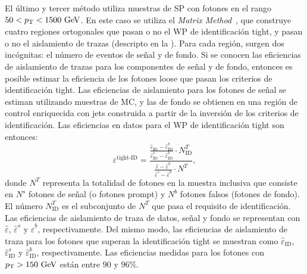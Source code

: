 El último y tercer método utiliza muestras de \ac{SP} con fotones en el rango \(50<p_{\text{T}}<1500~\text{GeV}\). En este caso se utiliza el \textit{Matrix Method}~\cite{ATLAS-EGamma-Performance-2015-2016}, que construye cuatro regiones ortogonales que pasan o no el \ac{WP} de identificación tight, y pasan o no el aislamiento de trazas (descripto en la \Sect{\ref{subsec:objects:egamma:iso}}). Para cada región, surgen dos incógnitas: el número de eventos de señal y de fondo.
Si se conocen las eficiencias de aislamiento de trazas para los componentes de señal y de fondo, entonces es posible estimar la eficiencia de los fotones loose que pasan los criterios de identificación tight. Las eficiencias de aislamiento para los fotones de señal se estiman utilizando muestras de \ac{MC}, y las de fondo se obtienen en una región de control enriquecida con jets construida a partir de la inversi\'on de los criterios de identificación.
Las eficiencias en datos para el \ac{WP} de identificación tight son entonces:
\begin{equation*}
    \varepsilon^{\text{tight-ID}} = \frac{
        \frac{
            \hat{\varepsilon}_{\text{ID}} - \hat{\varepsilon}_{\text{ID}}^b
        }{
            \hat{\varepsilon}_{\text{ID}}^s - \hat{\varepsilon}_{\text{ID}}^b
        }
        \cdot
        N_{\text{ID}}^T
    }{
        \frac{
            \hat{\varepsilon} - \hat{\varepsilon}^b
        }{
            \hat{\varepsilon}^s - \hat{\varepsilon}^b
        }
        \cdot
        N^T
    },
\end{equation*}
donde \(N^T\) representa la totalidad de fotones en la muestra inclusiva que consiste en \(N^s\) fotones de señal (o fotones prompt) y \(N^b\) fotones falsos (fotones de fondo). El número \(N^T_{\text{ID}}\) es el subconjunto de \(N^T\) que pasa el requisito de identificación. Las eficiencias de aislamiento de traza de datos, señal y fondo se representan con \(\hat{\varepsilon}\), \(\hat{\varepsilon}^s\) y \(\hat{\varepsilon}^b\), respectivamente. Del mismo modo, las eficiencias de aislamiento de traza para los fotones que superan la identificación tight se muestran como \(\hat{\varepsilon}_{\text{ID}}\), \(\hat{\varepsilon}_{\text{ID}}^s\) y \(\hat{\varepsilon}_{\text{ID}}^b\), respectivamente. Las eficiencias medidas para los fotones con \(p_{\text{T}}>150~\text{GeV}\) están entre \(90\) y \(96\%\).






